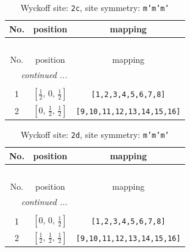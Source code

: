 \documentclass[fleqn,8pt]{jsarticle}
\begin{document}
\renewcommand{\arraystretch}{1.2}
\begin{longtable}{ccc}
\caption{Wyckoff site: {\tt 2c}, site symmetry: {\tt m'm'm'}}
 \\
 \hline \hline
No. & position & mapping \\ \hline \endfirsthead

\multicolumn{2}{l}{\tablename\ \thetable{}} \\
 \hline \hline
No. & position & mapping \\ \hline \endhead

 \hline \hline
\multicolumn{2}{r}{\footnotesize\it continued ...} \\ \endfoot

 \hline \hline
\multicolumn{2}{r}{} \\ \endlastfoot

1 & $\left[ \frac{1}{2},\, 0,\, \frac{1}{2} \right]$ & {\tt [1,2,3,4,5,6,7,8]} \\ \hline
2 & $\left[ 0,\, \frac{1}{2},\, \frac{1}{2} \right]$ & {\tt [9,10,11,12,13,14,15,16]} \\
\end{longtable}
\renewcommand{\arraystretch}{1.2}
\begin{longtable}{ccc}
\caption{Wyckoff site: {\tt 2d}, site symmetry: {\tt m'm'm'}}
 \\
 \hline \hline
No. & position & mapping \\ \hline \endfirsthead

\multicolumn{2}{l}{\tablename\ \thetable{}} \\
 \hline \hline
No. & position & mapping \\ \hline \endhead

 \hline \hline
\multicolumn{2}{r}{\footnotesize\it continued ...} \\ \endfoot

 \hline \hline
\multicolumn{2}{r}{} \\ \endlastfoot

1 & $\left[ 0,\, 0,\, \frac{1}{2} \right]$ & {\tt [1,2,3,4,5,6,7,8]} \\ \hline
2 & $\left[ \frac{1}{2},\, \frac{1}{2},\, \frac{1}{2} \right]$ & {\tt [9,10,11,12,13,14,15,16]} \\
\end{longtable}
\renewcommand{\arraystretch}{1.2}
\end{document}
